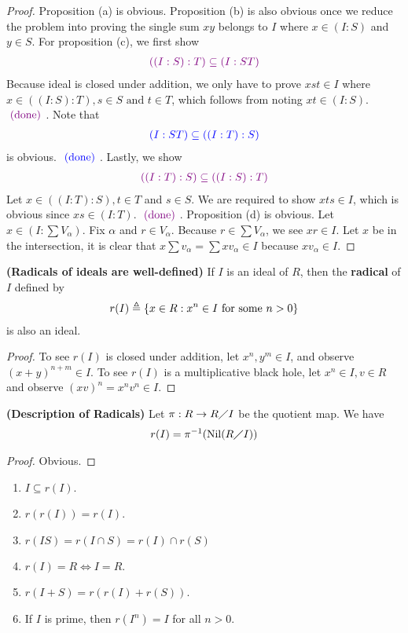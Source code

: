 \documentclass{report}
\begin{document}
\begin{proof}
Proposition (a) is obvious. Proposition (b) is also obvious once we reduce the problem into proving the single sum $xy$ belongs to  $I$ where  $x\in (I:S)$ and $y \in S$. For proposition (c), we first show 
\begin{align*}
\textcolor{violet}{((I:S):T)\subseteq (I:ST)}
\end{align*}
Because ideal is closed under addition, we only have to prove $xst\in I$ where $x\in ((I:S):T), s \in S\text{ and } t \in T$, which follows from noting $xt \in (I:S)$. $\textcolor{violet}{\text{ (done) }}$. Note that  
\begin{align*}
\textcolor{blue}{(I:ST)\subseteq ((I:T):S)}
\end{align*}
is obvious. $\textcolor{blue}{\text{ (done) }}$. Lastly, we show 
\begin{align*}
\textcolor{violet}{((I:T):S)\subseteq ((I:S):T)}
\end{align*}
Let $x\in ((I:T):S),t\in T$ and $s \in S$. We are required to show $xts \in I$, which is obvious since $xs \in (I:T)$. $\textcolor{violet}{\text{ (done) }}$. Proposition (d) is obvious.  Let $x \in (I: \sum V_\alpha )$. Fix $\alpha $ and $r \in V_\alpha $. Because $r\in \sum V_\alpha $, we see $xr\in I$. Let $x$ be in the intersection, it is clear that $x \sum v_\alpha =\sum xv_\alpha \in I$ because $xv_\alpha \in I$.     
\end{proof}
\begin{theorem}
\textbf{(Radicals of ideals are well-defined)} If $I$ is an ideal of $R$, then the  \textbf{radical} of $I$ defined by 
 \begin{align*}
r(I)\triangleq  \{ x\in R: x^n\in I\text{ for some }n>0 \}
\end{align*}
is also an ideal. 
\end{theorem}
\begin{proof}
  To see $r(I)$ is closed under addition, let $x^n,y^m \in I$, and observe $(x+y)^{n+m}\in I$. To see $r(I)$ is a multiplicative black hole, let $x^n\in I,v \in R$ and observe $(xv)^n=x^nv^n \in I$. 
\end{proof}
\begin{theorem}
\textbf{(Description of Radicals)} Let $\pi : R \rightarrow R \diagup I$ be the quotient map. We have
\begin{align*}
r(I)= \pi ^{-1}(\operatorname{Nil}(R\diagup I)) 
\end{align*}
\end{theorem}
\begin{proof}
Obvious. 
\end{proof}
\begin{question}{}{}
  \begin{enumerate}[label=(\alph*)]
    \item $I \subseteq r(I)$. 
    \item $r(r(I))=r(I)$.  
    \item $r(IS)=r(I\cap S)=r(I)\cap r(S)$
    \item $r(I)=R \iff  I= R$. 
    \item $r(I+S)=r(r(I)+r(S))$. 
    \item If $I$ is prime, then  $r(I^n)=I$ for all $n>0$. 
  \end{enumerate}
\end{question}
\end{document}
